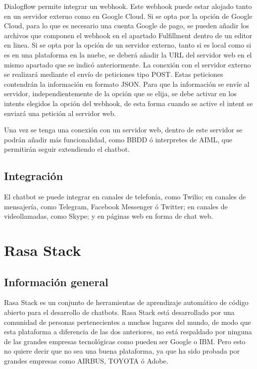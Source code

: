 Dialogflow permite integrar un webhook. Este webhook puede estar alojado tanto en un servidor externo como en Google Cloud. Si se opta por la opción de Google Cloud, para lo que es necesario una cuenta Google de pago, se pueden añadir los archivos que componen el webhook en el apartado Fulfillment dentro de un editor en linea. Si se opta por la opción de un servidor externo, tanto si es local como si es en una plataforma en la nuebe, se deberá añadir la URL del servidor web en el mismo apartado que se indicó anteriormente. La conexión con el servidor externo se realizará mediante el envío de peticiones tipo POST. Estas peticiones contendrán la información en formato JSON. Para que la información se envíe al servidor, independientemente de la opción que se elija, se debe activar en los intents elegidos la opción del webhook, de esta forma cuando se active el intent se enviará una petición al servidor web.

Una vez se tenga una conexión con un servidor web, dentro de este servidor se podrán añadir más funcionalidad, como BBDD ó interpretes de AIML, que permitirán seguir extendiendo el chatbot.

\subsection*{Integración}

El chatbot se puede integrar en canales de telefonía, como Twilio; en canales de mensajería, como Telegram, Facebook Messenger ó Twitter; en canales de videollamadas, como Skype; y en páginas web en forma de chat web.


\section{Rasa Stack}

\subsection*{Información general}

Rasa Stack es un conjunto de herramientas de aprendizaje automático de código abierto para el desarrollo de chatbots. Rasa Stack está desarrollado por una comunidad de personas pertenecientes a muchos lugares del mundo, de modo que esta plataforma a diferencia de las dos anteriores, no está respaldado por ninguna de las grandes empresas tecnológicas como pueden ser Google o IBM. Pero esto no quiere decir que no sea una buena plataforma, ya que ha sido probada por grandes empresas como AIRBUS, TOYOTA ó Adobe.

